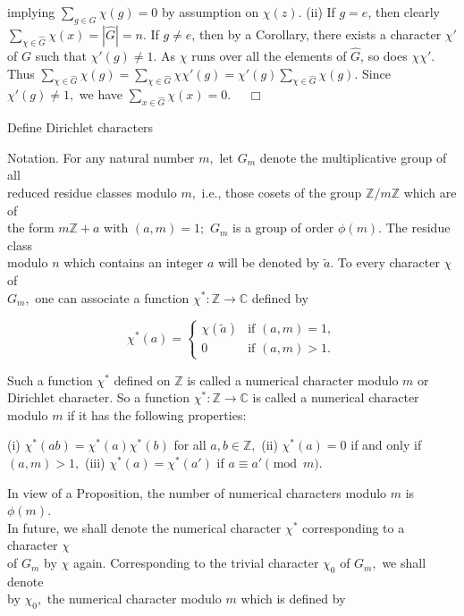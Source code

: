 implying \( \sum_{g \in G} \chi(g) = 0 \) by assumption on \( \chi(z) \).
(ii) If \( g = e \), then clearly \(\sum_{\chi \in \hat{G}} \chi(x) = |\hat{G}| = n\). If \( g \neq e \), then by a Corollary, there exists a character 
\(\chi'\) of \( G \) such that \(\chi'(g) \neq 1\). As \( \chi \) runs over all the elements of \( \hat{G} \), so does \( \chi\chi' \).
Thus \(\sum_{\chi \in \hat{G}} \chi(g) = \sum_{\chi \in \hat{G}} \chi\chi'(g) = \chi'(g) \sum_{\chi \in \hat{G}} \chi(g).\) Since \(\chi'(g) \neq 1,\) 
we have \(\sum_{x \in \hat{G}} \chi(x) = 0.\) \(\quad \Box\)


Define Dirichlet characters

Notation. For any natural number \(m,\) let \(G_m\) denote the multiplicative group of all \\
reduced residue classes modulo \(m,\) i.e., those cosets of the group \(\mathbb{Z}/m\mathbb{Z}\) which are of \\
the form \(m\mathbb{Z} + a\) with \((a, m) = 1;\) \(G_m\) is a group of order \(\phi(m).\) The residue class \\
modulo \(n\) which contains an integer \(a\) will be denoted by \(\tilde{a}.\) To every character \(\chi\) of \\
\(G_m,\) one can associate a function \(\chi^*: \mathbb{Z} \longrightarrow \mathbb{C}\) defined by

\[
\chi^*(a) = 
\begin{cases}
    \chi(\tilde{a}) & \text{if } (a, m) = 1, \\
    0 & \text{if } (a, m) > 1.
\end{cases}
\]

Such a function \(\chi^*\) defined on \(\mathbb{Z}\) is called a numerical character modulo \(m\) or Dirichlet character. 
So a function \(\chi^*: \mathbb{Z} \longrightarrow \mathbb{C}\) is called a numerical character modulo \(m\) if it has the
following properties:

(i) \(\chi^*(ab) = \chi^*(a)\chi^*(b)\) for all \(a, b \in \mathbb{Z},\)
(ii) \(\chi^*(a) = 0\) if and only if \((a, m) > 1,\)
(iii) \(\chi^*(a) = \chi^*(a')\) if \(a \equiv a' \pmod{m}.\)

In view of a Proposition, the number of numerical characters modulo \(m\) is \(\phi(m).\) \\
In future, we shall denote the numerical character \(\chi^*\) corresponding to a character \(\chi\) \\
of \(G_m\) by \(\chi\) again. Corresponding to the trivial character \(\chi_0\) of \(G_m,\) we shall denote \\
by \(\chi_0,\) the numerical character modulo \(m\) which is defined by

